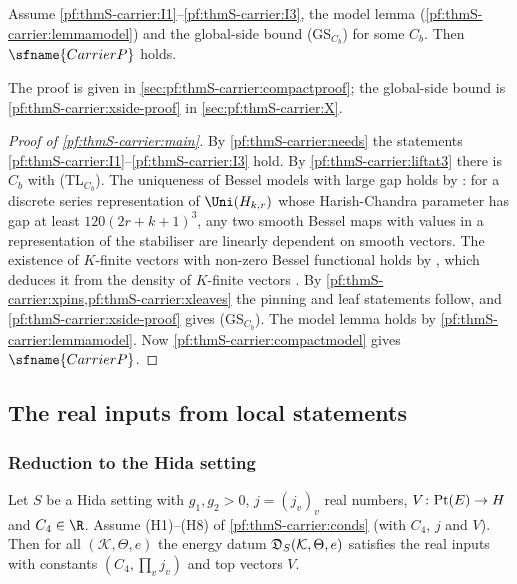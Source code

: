 \begin{proposition}\label{pf:thmS-carrier:compactmodel}
Assume \ref{pf:thmS-carrier:I1}--\ref{pf:thmS-carrier:I3}, the model lemma (\cref{pf:thmS-carrier:lemmamodel}) and the
global-side bound (GS$_{C_b}$) for some $C_b$. Then $\sfname{CarrierP}$ holds.
\end{proposition}

The proof is given in \cref{sec:pf:thmS-carrier:compactproof}; the global-side bound is
\cref{pf:thmS-carrier:xside-proof} in \cref{sec:pf:thmS-carrier:X}.

\begin{proof}[Proof of \cref{pf:thmS-carrier:main}]
By \cref{pf:thmS-carrier:needs} the statements \ref{pf:thmS-carrier:I1}--\ref{pf:thmS-carrier:I3} hold. By
\cref{pf:thmS-carrier:liftat3} there is $C_b$ with (TL$_{C_b}$). The uniqueness of Bessel models with large gap holds by
: for a discrete series representation of $\Uni(H_{k,r})$ whose
Harish-Chandra parameter has gap at least $120(2r+k+1)^3$, any two smooth Bessel maps with values in a representation of
the stabiliser are linearly dependent on smooth vectors. The existence of $K$-finite vectors with non-zero Bessel
functional holds by , which deduces it from the density of $K$-finite
vectors . By \cref{pf:thmS-carrier:xpins,pf:thmS-carrier:xleaves}
the pinning and leaf statements follow, and \cref{pf:thmS-carrier:xside-proof} gives (GS$_{C_b}$). The model lemma holds by
\cref{pf:thmS-carrier:lemmamodel}. Now \cref{pf:thmS-carrier:compactmodel} gives $\sfname{CarrierP}$.
\end{proof}

\subsection{The real inputs from local statements}\label{sec:pf:thmS-carrier:parts}

\subsubsection{Reduction to the Hida setting}
\begin{proposition}\label{pf:thmS-carrier:realconcrete}
Let $S$ be a Hida setting with $g_1,g_2>0$, $j=(j_v)_v$ real numbers, $V\colon\mathrm{Pt}(E)\to H$ and $C_4\in\R$.
Assume (H1)--(H8) of \cref{pf:thmS-carrier:conds} (with $C_4$, $j$ and $V$). Then for all $(\mathcal K,\Theta,e)$ the energy
datum $\mathfrak{D}_S(\mathcal K,\Theta,e)$ satisfies the real inputs with constants $(C_4,\prod_vj_v)$ and top vectors $V$.
\end{proposition}

